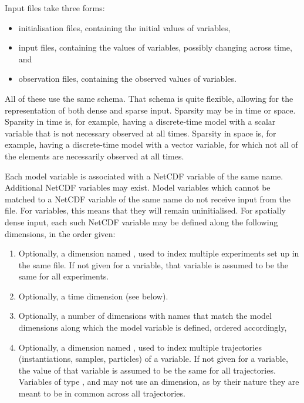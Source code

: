 Input files take three forms:
\begin{itemize}
\item initialisation files, containing the initial values of 
  variables,
\item input files, containing the values of  variables, possibly
  changing across time, and
\item observation files, containing the observed values of 
  variables.
\end{itemize}
All of these use the same schema. That schema is quite flexible, allowing for
the representation of both dense and sparse input. Sparsity may be in time or
space. Sparsity in time is, for example, having a discrete-time model with a
scalar  variable that is not necessary observed at all
times. Sparsity in space is, for example, having a discrete-time model with a
vector  variable, for which not all of the elements are necessarily
observed at all times.

Each model variable is associated with a NetCDF variable of the same
name. Additional NetCDF variables may exist. Model variables which cannot be
matched to a NetCDF variable of the same name do not receive input from the
file. For  variables, this means that they will remain
uninitialised. For spatially dense input, each such NetCDF variable may be
defined along the following dimensions, in the order given:
\begin{enumerate}
\item Optionally, a dimension named , used to index multiple
  experiments set up in the same file. If not given for a variable, that
  variable is assumed to be the same for all experiments.
\item Optionally, a time dimension (see below).
\item Optionally, a number of dimensions with names that match the model
  dimensions along which the model variable is defined, ordered accordingly,
\item Optionally, a dimension named , used to index multiple
  trajectories (instantiations, samples, particles) of a variable. If not
  given for a variable, the value of that variable is assumed to be the same
  for all trajectories. Variables of type ,  and
   may not use an  dimension, as by their nature they are
  meant to be in common across all trajectories.
\end{enumerate}

